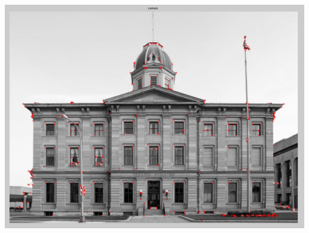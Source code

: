 \documentclass[11pt]{article}
\begin{document}
\includegraphics[scale=0.5]{corners}
\section{}
\end{document}
